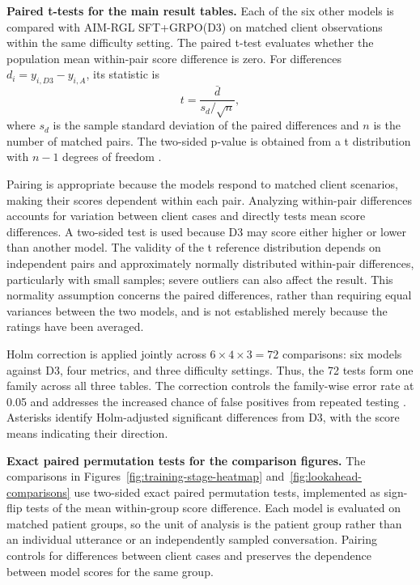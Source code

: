 \textbf{Paired t-tests for the main result tables.}
Each of the six other models is compared with AIM-RGL SFT+GRPO(D3) on matched client observations within the same difficulty setting. The paired t-test evaluates whether the population mean within-pair score difference is zero. For differences \(d_i=y_{i,D3}-y_{i,A}\), its statistic is
\begin{equation}
t=\frac{\bar d}{s_d/\sqrt{n}},
\end{equation}
where \(s_d\) is the sample standard deviation of the paired differences and \(n\) is the number of matched pairs. The two-sided p-value is obtained from a t distribution with \(n-1\) degrees of freedom \cite{scipyPairedTTest}.

Pairing is appropriate because the models respond to matched client scenarios, making their scores dependent within each pair. Analyzing within-pair differences accounts for variation between client cases and directly tests mean score differences. A two-sided test is used because D3 may score either higher or lower than another model. The validity of the t reference distribution depends on independent pairs and approximately normally distributed within-pair differences, particularly with small samples; severe outliers can also affect the result. This normality assumption concerns the paired differences, rather than requiring equal variances between the two models, and is not established merely because the ratings have been averaged.

Holm correction is applied jointly across \(6 \times 4 \times 3=72\) comparisons: six models against D3, four metrics, and three difficulty settings. Thus, the 72 tests form one family across all three tables. The correction controls the family-wise error rate at 0.05 and addresses the increased chance of false positives from repeated testing \cite{statsmodelsMultipleTests}. Asterisks identify Holm-adjusted significant differences from D3, with the score means indicating their direction.

\textbf{Exact paired permutation tests for the comparison figures.}
The comparisons in Figures~\ref{fig:training-stage-heatmap} and~\ref{fig:lookahead-comparisons} use two-sided exact paired permutation tests, implemented as sign-flip tests of the mean within-group score difference. Each model is evaluated on matched patient groups, so the unit of analysis is the patient group rather than an individual utterance or an independently sampled conversation. Pairing controls for differences between client cases and preserves the dependence between model scores for the same group.

